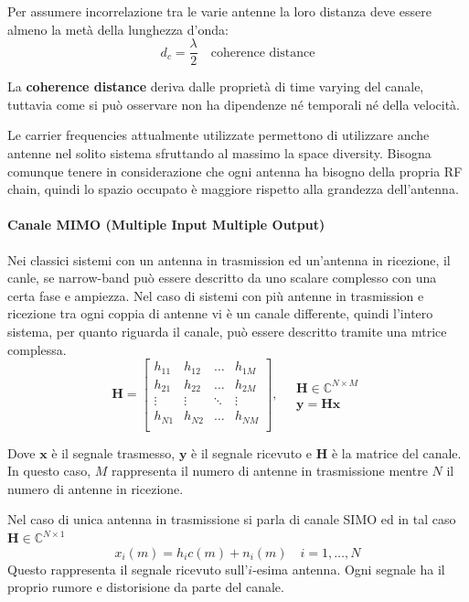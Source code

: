 Per assumere incorrelazione tra le varie antenne la loro distanza deve essere almeno la metà della lunghezza d'onda:
\[
    d_c = \frac{\lambda}{2} \quad \text{coherence distance}
\]  

La \textbf{coherence distance} deriva dalle proprietà di time varying del canale, tuttavia come si può osservare non ha dipendenze né temporali né della velocità.

Le carrier frequencies attualmente utilizzate permettono di utilizzare anche antenne nel solito sistema sfruttando al massimo la space diversity. Bisogna comunque tenere in considerazione che ogni antenna ha bisogno della propria RF chain, quindi lo spazio occupato è maggiore rispetto alla grandezza dell'antenna.


\paragraph*{Canale MIMO (Multiple Input Multiple Output)}


Nei classici sistemi con un antenna in trasmission ed un'antenna in ricezione, il canle, se narrow-band può essere descritto da uno scalare complesso con una certa fase e ampiezza.
Nel caso di sistemi con più antenne in trasmission e ricezione tra ogni coppia di antenne vi è un canale differente, quindi l'intero sistema, per quanto riguarda il canale, può essere descritto tramite una mtrice complessa.
\[ 
    \mathbf{H} = 
    \begin{bmatrix}
        h_{11} & h_{12} & \ldots & h_{1M} \\
        h_{21} & h_{22} & \ldots & h_{2M} \\
        \vdots & \vdots & \ddots & \vdots \\
        h_{N1} & h_{N2} & \ldots & h_{NM} \\
    \end{bmatrix}
    , \quad
    \begin{array}{ll}
            \mathbf{H} \in \mathbb{C}^{N \times M} \\
            \mathbf{y} = \mathbf{Hx} 
    \end{array}
\]

Dove $\mathbf{x}$ è il segnale trasmesso, $\mathbf{y}$ è il segnale ricevuto e $\mathbf{H}$ è la matrice del canale. In questo caso, $M$ rappresenta il numero di antenne in trasmissione mentre $N$ il numero di antenne in ricezione.

Nel caso di unica antenna in trasmissione si parla di canale SIMO ed in tal caso $\mathbf{H} \in \mathbb{C}^{N \times 1}$
\[
    x_i(m) = h_i c(m) + n_i(m) \quad i = 1, \ldots, N
\]
Questo rappresenta il segnale ricevuto sull'$i$-esima antenna. Ogni segnale ha il proprio rumore e distorisione da parte del canale.


